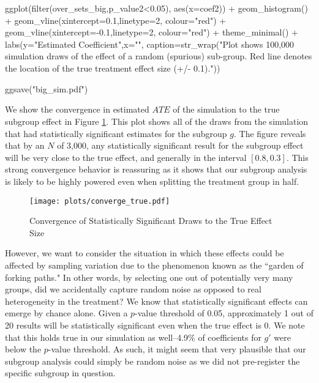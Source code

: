 \documentclass[12pt, letterpaper]{article}
\newenvironment{Shaded}{\begin{snugshade}}{\end{snugshade}}
\newcommand{\AttributeTok}[1]{\textcolor[rgb]{0.77,0.63,0.00}{#1}}
\newcommand{\DecValTok}[1]{\textcolor[rgb]{0.00,0.00,0.81}{#1}}
\newcommand{\FloatTok}[1]{\textcolor[rgb]{0.00,0.00,0.81}{#1}}
\newcommand{\FunctionTok}[1]{\textcolor[rgb]{0.00,0.00,0.00}{#1}}
\newcommand{\NormalTok}[1]{#1}
\newcommand{\SpecialCharTok}[1]{\textcolor[rgb]{0.00,0.00,0.00}{#1}}
\newcommand{\StringTok}[1]{\textcolor[rgb]{0.31,0.60,0.02}{#1}}
\begin{document}
\begin{Shaded}
\begin{Highlighting}[]
\FunctionTok{ggplot}\NormalTok{(}\FunctionTok{filter}\NormalTok{(over\_sets\_big,p\_value2}\SpecialCharTok{\textless{}}\FloatTok{0.05}\NormalTok{),}
       \FunctionTok{aes}\NormalTok{(}\AttributeTok{x=}\NormalTok{coef2)) }\SpecialCharTok{+}
  \FunctionTok{geom\_histogram}\NormalTok{() }\SpecialCharTok{+}
  \FunctionTok{geom\_vline}\NormalTok{(}\AttributeTok{xintercept=}\FloatTok{0.1}\NormalTok{,}\AttributeTok{linetype=}\DecValTok{2}\NormalTok{, }\AttributeTok{colour=}\StringTok{"red"}\NormalTok{) }\SpecialCharTok{+}
  \FunctionTok{geom\_vline}\NormalTok{(}\AttributeTok{xintercept=}\SpecialCharTok{{-}}\FloatTok{0.1}\NormalTok{,}\AttributeTok{linetype=}\DecValTok{2}\NormalTok{, }\AttributeTok{colour=}\StringTok{"red"}\NormalTok{) }\SpecialCharTok{+}
  \FunctionTok{theme\_minimal}\NormalTok{() }\SpecialCharTok{+}
  \FunctionTok{labs}\NormalTok{(}\AttributeTok{y=}\StringTok{"Estimated Coefficient"}\NormalTok{,}\AttributeTok{x=}\StringTok{""}\NormalTok{,}
       \AttributeTok{caption=}\FunctionTok{str\_wrap}\NormalTok{(}\StringTok{"Plot shows 100,000 simulation draws of the effect of a random (spurious) sub{-}group. Red line denotes the location of the true treatment effect size (+/{-} 0.1)."}\NormalTok{)) }

\FunctionTok{ggsave}\NormalTok{(}\StringTok{"big\_sim.pdf"}\NormalTok{)}
\end{Highlighting}
\end{Shaded}

We show the convergence in estimated $\hat{ATE}$ of the simulation to the true subgroup effect in Figure \ref{converge}. This plot shows all of the draws from the simulation that had statistically significant estimates for the subgroup $g$. The figure reveals that by an $N$ of 3,000, any statistically significant result for the subgroup effect will be very close to the true effect, and generally in the interval $[0.8,0.3]$. This strong convergence behavior is reassuring as it shows that our subgroup analysis is likely to be highly powered even when splitting the treatment group in half.

\begin{figure}
    \centering
    \texttt{[image: plots/converge\_true.pdf]}
    \caption{Convergence of Statistically Significant Draws to the True Effect Size}
    \label{converge}
\end{figure}

However, we want to consider the situation in which these effects could be affected by sampling variation due to the phenomenon known as the ``garden of forking paths." In other words, by selecting one out of potentially very many groups, did we accidentally capture random noise as opposed to real heterogeneity in the treatment? We know that statistically significant effects can emerge by chance alone. Given a $p$-value threshold of 0.05, approximately 1 out of 20 results will be statistically significant even when the true effect is 0. We note that this holds true in our simulation as well--4.9\% of coefficients for $g'$ were below the $p$-value threshold. As such, it might seem that very plausible that our subgroup analysis could simply be random noise as we did not pre-register the specific subgroup in question. 
\end{document}
